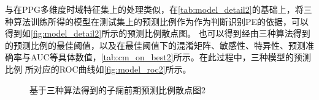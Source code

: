 与在PPG多维度时域特征集上的处理类似，在\autoref{tab:model_detail2}的基础上，将三种算法训练所得的模型在测试集上的预测比例作为作为判断识别PE的依据，可以得到如\autoref{fig:model_detail2}所示的预测比例散点图。
也可以得到经由三种算法得到的预测比例的最佳阈值，以及在最佳阈值下的混淆矩阵、敏感性、特异性、预测准确率与AUC等具体数值，\autoref{tab:cm_on_best2}所示。在此过程中，三种模型的预测比例
所对应的ROC曲线如\autoref{fig:model_roc2}所示。
\begin{figure}[htbp]
      \centering
      \quad
      \caption{\label{fig:model_detail2}基于三种算法得到的子痫前期预测比例散点图2}
\end{figure}

